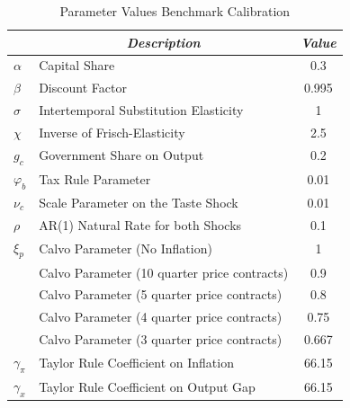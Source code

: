 \documentclass[12pt,a4paper,oneside,titlepage]{article}
\begin{document}
\begin{table}[th]
\centering
\caption{Parameter Values Benchmark Calibration}
\bigskip
\bgroup
\def\arraystretch{1.5}
\begin{tabular}{p{1.2cm} l c}
\toprule\toprule \noalign{\smallskip}
 & \multicolumn{1}{c}{\textit{Description}} & \textit{Value} \\
\hline\noalign{\smallskip}

$\alpha$ & Capital Share   & 0.3 \\
$\beta$  & Discount Factor & 0.995 \\
$\sigma$ & Intertemporal Substitution Elasticity & 1 \\
$\chi$ & Inverse of Frisch-Elasticity & 2.5 \\
$g_c$ & Government Share on Output & 0.2 \\
$\varphi_b$ & Tax Rule Parameter & 0.01 \\
$\nu_c$ & Scale Parameter on the Taste Shock & 0.01 \\
$\rho$ & AR(1) Natural Rate for both Shocks & 0.1 \\
$\xi_p$ & Calvo Parameter (No Inflation) & 1 \\
 & Calvo Parameter (10 quarter price contracts) & 0.9 \\
 & Calvo Parameter (5  quarter price contracts) & 0.8 \\
 & Calvo Parameter (4  quarter price contracts) & 0.75 \\
 & Calvo Parameter (3  quarter price contracts) & 0.667 \\
$\gamma_{\pi}$ & Taylor Rule Coefficient on Inflation & 66.15 \\
$\gamma_x$ & Taylor Rule Coefficient on Output Gap & 66.15 \\
\bottomrule
\end{tabular}
\egroup
\label{tab:Tabel1}
\end{table}
\end{document}
